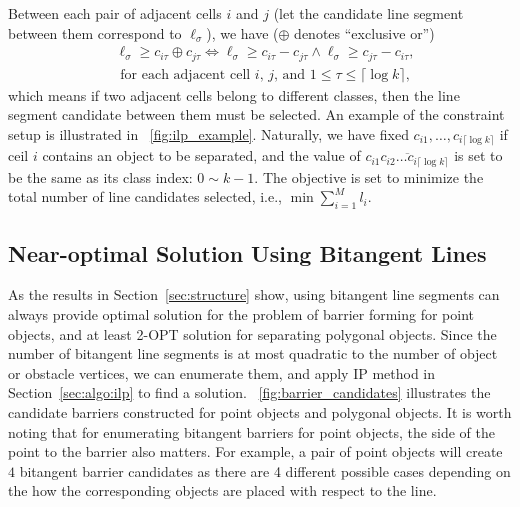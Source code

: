 Between each pair of adjacent cells $i$ and $ j$ (let the candidate line segment between them correspond to $\ell_\sigma$), we have ($\oplus$ denotes ``exclusive or'')
\begin{equation}
\begin{split}
    &\ell_\sigma \geq c_{i\tau} \oplus c_{j\tau}  \Leftrightarrow \ell_\sigma \geq c_{i\tau} - c_{j\tau} \wedge \ell_\sigma\geq c_{j\tau} - c_{i\tau}, \\
    &\text{  for each adjacent cell $i$, $j$, and $1\leq \tau \leq \lceil \log k \rceil$},
\end{split}
\end{equation}
which means if two adjacent cells belong to different classes, then the line segment candidate between them must be selected. An example of the constraint setup is illustrated in ~\ref{fig:ilp_example}.
Naturally, we have fixed $c_{i1},\dots,c_{i\lceil \log k\rceil}$ if ceil $i$ contains an object to be separated, and the value of $\overline{c_{i1}c_{i2}\dots c_{i\lceil \log k\rceil}}$ is set to be the same as its class index: $0\sim k-1$.
The objective is set to minimize the total number of line candidates selected, i.e., $\min \sum_{i=1}^{M} l_i$.

\subsection{Near-optimal Solution Using Bitangent Lines}
As the results in Section~\ref{sec:structure} show, using bitangent line segments 
can always provide optimal solution for the problem of barrier forming for point objects, 
and at least 2-OPT
solution for separating polygonal objects. 
Since the number of bitangent line segments is at 
most quadratic to the number of object or obstacle vertices, 
we can enumerate them, and apply IP method in Section~\ref{sec:algo:ilp} to find a solution. ~\ref{fig:barrier_candidates} illustrates the candidate barriers constructed for point objects and polygonal objects.
It is worth noting that for enumerating bitangent barriers for point objects, the side of the point to the barrier also matters. For example, a pair of point objects will create $4$ bitangent barrier candidates as there are 4 different possible cases depending on the how the corresponding objects are placed with respect to the line. 

